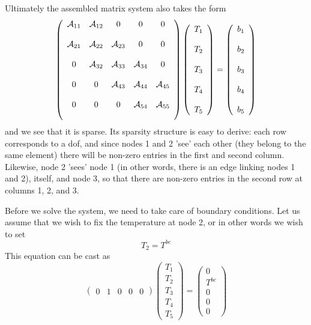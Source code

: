 Ultimately the assembled matrix system also takes the form
\[
\left(
\begin{array}{ccccc}
{\cal A}_{11} & {\cal A}_{12} & 0& 0& 0\\ \\
{\cal A}_{21} & {\cal A}_{22} & {\cal A}_{23}& 0 & 0\\\\
0 & {\cal A}_{32} & {\cal A}_{33}&  {\cal A}_{34}  & 0\\\\
0&0&   {\cal A}_{43} & {\cal A}_{44}&  {\cal A}_{45} \\\\
0&0&0   & {\cal A}_{54}&  {\cal A}_{55} \\\\
\end{array}
\right)
\left(
\begin{array}{c}
T_1 \\\\ T_2 \\\\ T_3 \\\\ T_4 \\\\ T_5
\end{array}
\right)
=
\left(
\begin{array}{c}
b_1\\\\
b_2\\\\
b_3\\\\
b_4\\\\
b_5
\end{array}
\right)
\]
and we see that it is sparse. Its sparsity structure is easy to derive: each row corresponds to a dof, 
and since nodes 1 and 2 'see' each other (they belong to the same element) there will be non-zero entries
in the first and second column. 
Likewise, node 2 'sees' node 1 (in other words, there is an edge linking nodes 1 and 2), itself, 
and node 3, so that there are non-zero entries in the second row at columns 1, 2, and 3.

Before we solve the system, we need to take care of boundary conditions.
Let us assume that we wish to fix the temperature at node 2, or in other words 
we wish to set 
\[
T_2 = T^{bc}
\]
This equation can be cast as
\[
\left(
\begin{array}{ccccc}
 0 & 1 & 0 & 0 & 0
\end{array}
\right)
\left(
\begin{array}{c}
T_1 \\ T_2 \\ T_3 \\ T_4 \\ T_5
\end{array}
\right)
=
\left(
\begin{array}{c}
0 \\
T^{bc} \\
0 \\
0 \\
0
\end{array}
\right)
\]

